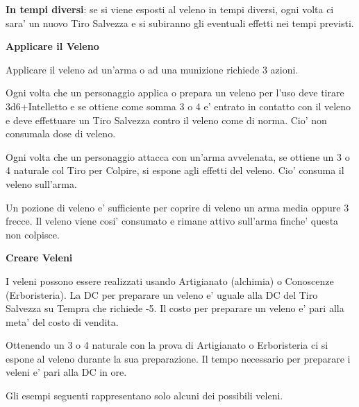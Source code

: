 \documentclass[a4paper,11pt,twoside,openany]{dndbook}
\begin{document}
{\textbf{In tempi diversi}: se si viene esposti al veleno in tempi diversi, ogni volta ci sara' un nuovo Tiro Salvezza e si subiranno gli eventuali effetti nei tempi previsti.

\bigskip

\textbf{Applicare il Veleno}

Applicare il veleno ad un'arma o ad una munizione richiede 3 azioni.

Ogni volta che un personaggio applica o prepara un veleno per l'uso deve tirare 3d6+Intelletto e se ottiene come somma 3 o 4 e' entrato in contatto con il veleno e deve effettuare un Tiro Salvezza contro il veleno come di norma. Cio' non consumala dose di veleno. 

Ogni volta che un personaggio attacca con un'arma avvelenata, se ottiene un 3 o 4 naturale col Tiro per Colpire, si espone agli effetti del veleno. Cio' consuma il veleno sull'arma.

Un pozione di veleno e' sufficiente per coprire di veleno un arma media oppure 3 frecce. Il veleno viene cosi' consumato e rimane attivo sull'arma finche' questa non colpisce.

\textbf{Creare Veleni}

I veleni possono essere realizzati usando Artigianato (alchimia) o Conoscenze (Erboristeria). La DC per preparare un veleno e' uguale alla DC del Tiro Salvezza su Tempra che richiede -5. Il costo per preparare un veleno e' pari alla meta' del costo di vendita.

Ottenendo un 3 o 4 naturale con la prova di Artigianato o Erboristeria ci si espone al veleno durante la sua preparazione. Il tempo necessario per preparare i veleni e' pari alla DC in ore. 

Gli esempi seguenti rappresentano solo alcuni dei possibili veleni.

\bigskip

}
\end{document}
